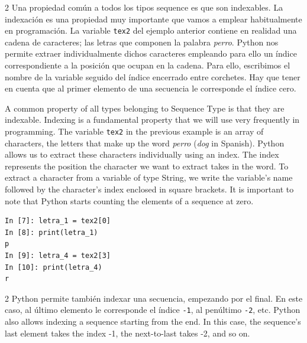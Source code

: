 \begin{paracol}{2}
Una propiedad común a todos los tipos sequence es que son indexables. La indexación es una propiedad muy importante que vamos a emplear habitualmente en programación. La variable \texttt{tex2} del ejemplo anterior contiene en realidad una cadena de caracteres; las letras que componen la palabra \emph{perro}. Python nos permite extraer individualmente dichos caracteres empleando para ello un índice correspondiente a la posición que ocupan en la cadena. Para ello, escribimos el nombre de la variable seguido del índice encerrado entre corchetes. Hay que tener en cuenta que al primer elemento de una secuencia le corresponde el índice cero.

\switchcolumn
A common property of all types belonging to Sequence Type is that they are indexable. Indexing is a fundamental property that we will use very frequently in programming. The variable \texttt{tex2} in the previous example is an array of characters, the letters that make up the word \emph{perro} (\emph{dog} in Spanish). Python allows us to extract these characters individually using an index. The index represents the position the character we want to extract takes in the word. To extract a character from a variable of type String, we write the variable's name followed by the character's index enclosed in square brackets. It is important to note that Python starts counting the elements of a sequence at zero.  
\end{paracol}

\begin{center}
    \begin{minipage}{0.3\textwidth}
\begin{verbatim}
In [7]: letra_1 = tex2[0]
In [8]: print(letra_1)
p
In [9]: letra_4 = tex2[3]
In [10]: print(letra_4)
r
\end{verbatim}
\end{minipage}
\end{center}
\begin{paracol}{2}
Python permite también indexar una secuencia, empezando por el final. En este caso, al último elemento le corresponde el índice  \texttt{-1}, al penúltimo \texttt{-2}, etc.
\switchcolumn
Python also allows indexing a sequence starting from the end. In this case, the sequence's last element takes the index -1, the next-to-last takes -2, and so on. 
\end{paracol}

